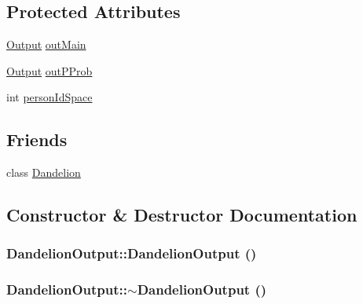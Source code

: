 \subsection*{Protected Attributes}
\begin{DoxyCompactItemize}
\item 
\hyperlink{classOutput}{Output} \hyperlink{classDandelionOutput_a51a7cd7b94daf399744a2bd091dbc893}{outMain}
\item 
\hyperlink{classOutput}{Output} \hyperlink{classDandelionOutput_a4600b137430cebc7b8d5926d516584a5}{outPProb}
\item 
int \hyperlink{classDandelionOutput_a3e9b9fa7f56b76760797e6a5e9ca84c9}{personIdSpace}
\end{DoxyCompactItemize}
\subsection*{Friends}
\begin{DoxyCompactItemize}
\item 
class \hyperlink{classDandelionOutput_a3d9ee1085aff51099ffe0efd4b300c8f}{Dandelion}
\end{DoxyCompactItemize}


\subsection{Constructor \& Destructor Documentation}
\hypertarget{classDandelionOutput_ae562a10e412aea6c27caf8316b31eb99}{
\subsubsection[{DandelionOutput}]{\setlength{\rightskip}{0pt plus 5cm}DandelionOutput::DandelionOutput ()}}
\label{classDandelionOutput_ae562a10e412aea6c27caf8316b31eb99}
\hypertarget{classDandelionOutput_aaf9c5c50d9328fb09f4a982c001f659f}{
\subsubsection[{$\sim$DandelionOutput}]{\setlength{\rightskip}{0pt plus 5cm}DandelionOutput::$\sim$DandelionOutput ()}}
\label{classDandelionOutput_aaf9c5c50d9328fb09f4a982c001f659f}


